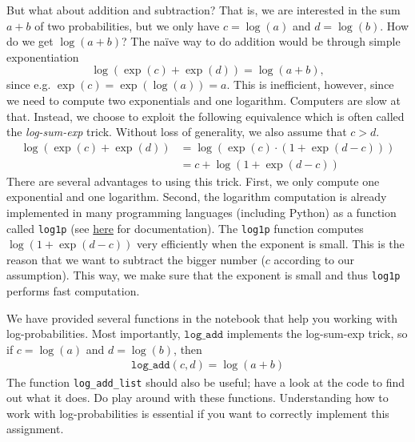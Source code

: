 \documentclass[11pt, a4paper]{article}
\begin{document}
But what about addition and subtraction?
That is, we are interested in the sum $a + b$ of two probabilities, but we only have $ c = \log(a) $ and $ d = \log(b) $.
How do we get $\log(a + b)$? 
The na\"ive way to do addition would be through simple exponentiation
\begin{equation*}
\log(\exp(c) + \exp(d)) = \log(a + b),
\end{equation*}
since e.g. $\exp(c) = \exp(\log(a)) = a$.
This is inefficient, however, since we need to compute two exponentials and one logarithm. Computers are slow at that. Instead, we choose to exploit the
following equivalence which is often called the \emph{log-sum-exp} trick. Without loss of generality, we also assume that $ c > d $.
\begin{align*}
\log(\exp(c) + \exp(d)) &= \log(\exp(c) \cdot (1 + \exp(d-c)))  \\
&= c + \log(1 + \exp(d-c)) 
\end{align*}
There are several advantages to using this trick. First, we only compute one exponential and one logarithm. Second, the logarithm computation is already 
implemented in many programming languages (including Python) as a function called \texttt{log1p} (see \href{https://docs.python.org/3/library/math.html}{here} for documentation). The \texttt{log1p} function computes $ \log(1 + \exp(d-c)) $ very efficiently when the exponent is small. This is the reason that we want to subtract
the bigger number ($ c $ according to our assumption). This way, we make sure that the exponent is small and thus \texttt{log1p} performs fast computation.



We have provided several functions in the notebook that help you working with log-probabilities.
Most importantly, $\texttt{log\_add}$ implements the log-sum-exp trick, so if $c = \log(a)$ and $d = \log(b)$, then
\begin{align}
  \texttt{log\_add}(c, d) 
    = \log( a + b )
\end{align}
The function \texttt{log\_add\_list} should also be useful; have a look at the code to find out what it does.
Do play around with these functions. 
Understanding how to work with log-probabilities is essential if you want to correctly implement this assignment.
\end{document}
